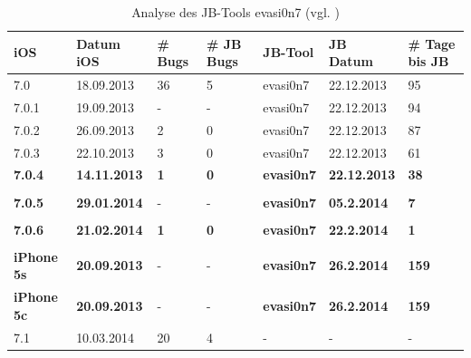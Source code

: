 \begin{table}[htp!]
    \begin{center}
        \begin{tabular}{| p{20mm} | p{22mm} | p{17mm} | p{25mm} | p{20mm} | p{22mm} | p{15mm} |} \hline
            \textbf{iOS} & \textbf{Datum iOS} & \textbf{\# Bugs} & \textbf{\# JB Bugs} & \textbf{JB-Tool} & \textbf{JB Datum} & \textbf{\# Tage bis JB} \\ \hline 
7.0 & 18.09.2013 &	36 & 5 & evasi0n7 & 22.12.2013 & 95 \\ \hline
7.0.1 & 19.09.2013 & - & - & evasi0n7 & 22.12.2013 &  94 \\ \hline
7.0.2 & 26.09.2013 & 2 & 0 & evasi0n7 & 22.12.2013 & 87 \\ \hline
7.0.3 & 22.10.2013 & 3 & 0 & evasi0n7 & 22.12.2013 & 61\\ \hline
\textbf{7.0.4 }& \textbf{14.11.2013} & \textbf{1} & \textbf{0} & \textbf{evasi0n7 }& \textbf{22.12.2013} & \textbf{38} \\ \hline
 & & & & & & \\ \hline
\textbf{7.0.5} & \textbf{29.01.2014} & - & - & \textbf{evasi0n7} & \textbf{05.2.2014} & \textbf{7} \\ \hline
& & & & & & \\ \hline
\textbf{7.0.6} & \textbf{21.02.2014} & \textbf{1} & \textbf{0} & \textbf{evasi0n7} & \textbf{22.2.2014} & \textbf{1} \\ \hline
& & & & & & \\ \hline
\textbf{iPhone 5s} & \textbf{20.09.2013} & - & - & \textbf{evasi0n7 }& \textbf{26.2.2014} & \textbf{159} \\ \hline
\textbf{iPhone 5c} & \textbf{20.09.2013} & - & - & \textbf{evasi0n7 }& \textbf{26.2.2014} & \textbf{159} \\ \hline
7.1 & 10.03.2014 & 20 & 4 & - & - & - \\ \hline
        \end{tabular} 
        \caption{Analyse des JB-Tools evasi0n7 (vgl. \cite{Apple[7]}) \protect\footnotemark}
        \label{tab:Analyseevasi0n7}
    \end{center}
\end{table}
\newpage

